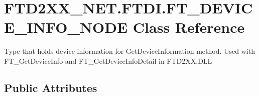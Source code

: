 \hypertarget{class_f_t_d2_x_x___n_e_t_1_1_f_t_d_i_1_1_f_t___d_e_v_i_c_e___i_n_f_o___n_o_d_e}{}\section{F\+T\+D2\+X\+X\+\_\+\+N\+E\+T.\+F\+T\+D\+I.\+F\+T\+\_\+\+D\+E\+V\+I\+C\+E\+\_\+\+I\+N\+F\+O\+\_\+\+N\+O\+DE Class Reference}
\label{class_f_t_d2_x_x___n_e_t_1_1_f_t_d_i_1_1_f_t___d_e_v_i_c_e___i_n_f_o___n_o_d_e}


Type that holds device information for Get\+Device\+Information method. Used with F\+T\+\_\+\+Get\+Device\+Info and F\+T\+\_\+\+Get\+Device\+Info\+Detail in F\+T\+D2\+X\+X.\+D\+LL  


\subsection*{Public Attributes}
